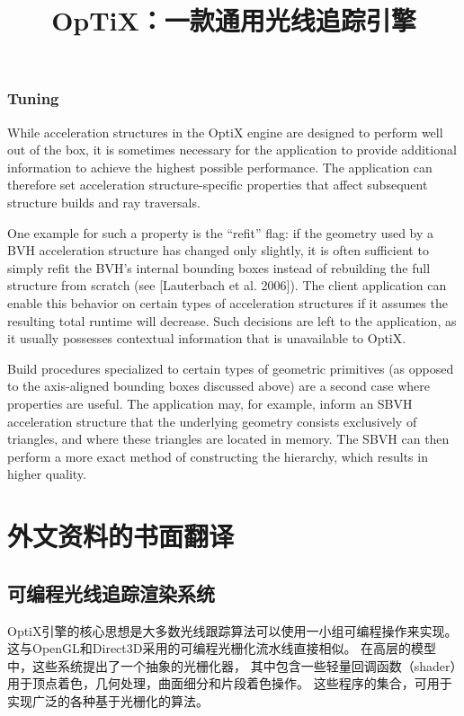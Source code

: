 \subsection{Tuning}

While acceleration structures in the OptiX engine are designed to
perform well out of the box, it is sometimes necessary for the application to provide additional information to achieve the highest
possible performance. The application can therefore set acceleration structure-specific properties that affect subsequent structure
builds and ray traversals.

One example for such a property is the “refit” flag: if the geometry
used by a BVH acceleration structure has changed only slightly, it is
often sufficient to simply refit the BVH’s internal bounding boxes
instead of rebuilding the full structure from scratch (see [Lauterbach et al. 2006]). The client application can enable this behavior
on certain types of acceleration structures if it assumes the resulting
total runtime will decrease. Such decisions are left to the application, as it usually possesses contextual information that is unavailable to OptiX.

Build procedures specialized to certain types of geometric primitives (as opposed to the axis-aligned bounding boxes discussed
above) are a second case where properties are useful. The application may, for example, inform an SBVH acceleration structure
that the underlying geometry consists exclusively of triangles, and
where these triangles are located in memory. The SBVH can then
perform a more exact method of constructing the hierarchy, which
results in higher quality.

\chapter{外文资料的书面翻译}

\title{OpTiX：一款通用光线追踪引擎}

\section{可编程光线追踪渲染系统}

OptiX引擎的核心思想是大多数光线跟踪算法可以使用一小组可编程操作来实现。 
这与OpenGL和Direct3D采用的可编程光栅化流水线直接相似。
在高层的模型中，这些系统提出了一个抽象的光栅化器，
其中包含一些轻量回调函数（shader）用于顶点着色，几何处理，曲面细分和片段着色操作。
这些程序的集合，可用于实现广泛的各种基于光栅化的算法。


